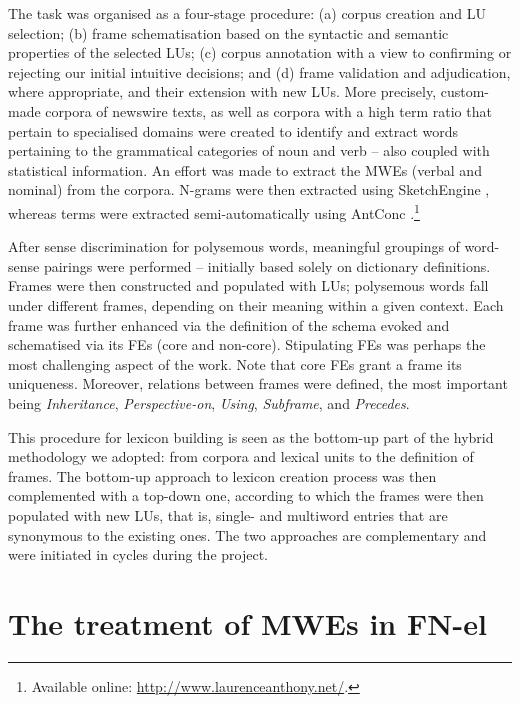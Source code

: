 \documentclass[output=paper,colorlinks,citecolor=brown]{langscibook}
\begin{document}
The task was organised as a four-stage procedure: (a) corpus creation and LU selection; (b) frame schematisation based on the syntactic and semantic properties of the selected LUs; (c) corpus annotation with a view to confirming or rejecting our initial intuitive decisions; and (d) frame validation and adjudication, where appropriate, and their extension with new LUs. More precisely, custom-made corpora of newswire texts, as well as corpora with a high term ratio that pertain to specialised domains were created to identify and extract words pertaining to the grammatical categories of noun and verb -- also coupled with statistical information. An effort was made to extract the MWEs (verbal and nominal) from the corpora. N-grams were then extracted using SketchEngine \citep{Kilgarriff2014}, whereas terms were extracted semi-automatically using AntConc \citep{anthony2005antconc}.\footnote{Available online: \url{http://www.laurenceanthony.net/}.}

After sense discrimination for polysemous words, meaningful groupings of word-sense pairings were performed -- initially based solely on dictionary definitions. Frames were then constructed and populated with LUs; polysemous words fall under different frames, depending on their meaning within a given context. Each frame was further enhanced via the definition of the schema evoked and schematised via its FEs (core and non-core). Stipulating FEs was perhaps the most challenging aspect of the work. Note that core FEs grant a frame its uniqueness. Moreover,  relations between frames were defined, the most important being \textit{Inheritance}, \textit{Perspective-on}, \textit{Using}, \textit{Subframe}, and \textit{Precedes}.

This procedure for lexicon building is seen as the bottom-up part of the hybrid methodology we adopted: from corpora and lexical units to the definition of frames. The bottom-up approach to lexicon creation process was then complemented with a top-down one, according to which the frames were then populated with new LUs, that is, single- and multiword entries that are synonymous to the existing ones. The two approaches are complementary and were initiated in cycles during the project.



\section{The treatment of MWEs in FN-el}
\label{sec:MWEs-in-FN-el}
\end{document}
